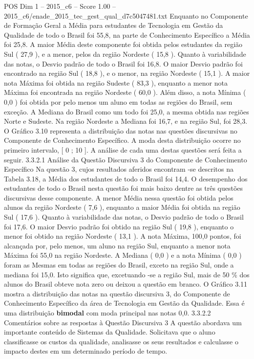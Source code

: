\begin{textsample}{POS Dim 1 – 2015\_c6 – Score 1.00 – 2015\_c6/enade\_2015\_tec\_gest\_qual\_d7c5047481.txt}
Enquanto no Componente de Formação Geral a Média para estudantes de Tecnologia em Gestão da Qualidade de todo o Brasil foi 55,8, na parte de Conhecimento Específico a Média foi 25,8.
A maior Média deste componente foi obtida pelos estudantes da região Sul ( 27,9 ), e a menor, pelos da região Nordeste ( 15,8 ).
Quanto à variabilidade das notas, o Desvio padrão de todo o Brasil foi 16,8.
O maior Desvio padrão foi encontrado na região Sul ( 18,8 ), e o menor, na região Nordeste ( 15,1 ).
A maior nota Máxima foi obtida na região Sudeste ( 83,3 ), enquanto a menor nota Máxima foi encontrada na região Nordeste ( 60,0 ).
Além disso, a nota Mínima ( 0,0 ) foi obtida por pelo menos um aluno em todas as regiões do Brasil, sem exceção.
A Mediana do Brasil como um todo foi 25,0, a mesma obtida nas regiões Norte e Sudeste.
Na região Nordeste a Mediana foi 16,7, e na região Sul, foi 28,3.
O Gráfico 3.10 representa a distribuição das notas nas questões discursivas no Componente de Conhecimento Específico.
A moda desta distribuição ocorre no primeiro intervalo, [ 0 ; 10 ].
A análise de cada uma destas questões será feita a seguir. 3.3.2.1 Análise da Questão Discursiva 3 do Componente de Conhecimento Específico Na questão 3, cujos resultados aferidos encontram -se descritos na Tabela 3.18, a Média dos estudantes de todo o Brasil foi 14,4.
O desempenho dos estudantes de todo o Brasil nesta questão foi mais baixo dentre as três questões discursivas desse componente.
A menor Média nessa questão foi obtida pelos alunos da região Nordeste ( 7,6 ), enquanto a maior Média foi obtida na região Sul ( 17,6 ).
Quanto à variabilidade das notas, o Desvio padrão de todo o Brasil foi 17,6.
O maior Desvio padrão foi obtido na região Sul ( 19,8 ), enquanto o menor foi obtido na região Nordeste ( 13,1 ).
A nota Máxima, 100,0 pontos, foi alcançada por, pelo menos, um aluno na região Sul, enquanto a menor nota Máxima foi 55,0 na região Nordeste.
A Mediana ( 0,0 ) e a nota Mínima ( 0,0 ) foram as Mesmas em todas as regiões do Brasil, exceto na região Sul, onde a mediana foi 15,0.
Isto significa que, excetuando -se a região Sul, mais de 50 \% dos alunos do Brasil obteve nota zero ou deixou a questão em branco.
O Gráfico 3.11 mostra a distribuição das notas na questão discursiva 3, do Componente de Conhecimento Específico da área de Tecnologia em Gestão da Qualidade.
Essa é uma distribuição \textbf{bimodal} com moda principal nas notas 0,0. 3.3.2.2 Comentários sobre as respostas à Questão Discursiva 3 A questão abordava um importante conteúdo de Sistemas da Qualidade.
Solicitava que o aluno classificasse os custos da qualidade, analisasse os seus resultados e calculasse o impacto destes em um determinado período de tempo.

\end{textsample}
